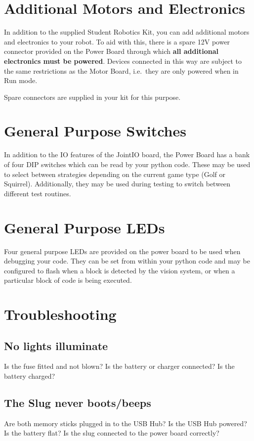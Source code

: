 \documentclass[a4paper, 12pt]{article}
\begin{document}
\section{Additional Motors and Electronics}

In addition to the supplied Student Robotics Kit, you can add additional motors and electronics to your robot. To aid with this, there is a spare 12V power connector provided on the Power Board through which \textbf{all additional electronics must be powered}. Devices connected in this way are subject to the same restrictions as the Motor Board, i.e.\ they are only powered when in Run mode.

\vspace{12pt}

Spare connectors are supplied in your kit for this purpose.


\section{General Purpose Switches}

In addition to the IO features of the JointIO board, the Power Board has a bank of four DIP switches which can be read by your python code. These may be used to select between strategies depending on the current game type (Golf or Squirrel). Additionally, they may be used during testing to switch between different test routines. 

\section{General Purpose LEDs}
Four general purpose LEDs are provided on the power board to be used when debugging your code. They can be set from within your python code and may be configured to flash when a block is detected by the vision system, or when a particular block of code is being executed.

\section{Troubleshooting}
\subsection{No lights illuminate}
Is the fuse fitted and not blown? Is the battery or charger connected? Is the battery charged?

\subsection{The Slug never boots/beeps}
Are both memory sticks plugged in to the USB Hub? Is the USB Hub powered? Is the battery flat? Is the slug connected to the power board correctly? 
\end{document}
